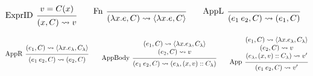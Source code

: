 \documentclass[acmsmall,review]{acmart}\settopmatter{printfolios=true,printccs=false,printacmref=false}
\theoremstyle{definition}
\theoremstyle{plain}
\newcommand*{\cons}{::}
\newcommand*{\semarrow}{\rightsquigarrow}
\begin{document}
\begin{figure}[h!]
  \scriptsize
  \begin{flushright}
    \fbox{$(e,C)\semarrow V\text{ or }(e',C')$}
  \end{flushright}
  \centering
  \vspace{0pt} %
  \[
    \begin{prooftree}
      \hypo{v=C(x)}
      \infer[left label=ExprID]1{
      (x, C)
      \semarrow
      v
      }
    \end{prooftree}\qquad
    \begin{prooftree}
      \infer[left label=Fn]0{
      (\lambda x.e, C)
      \semarrow
      \langle\lambda x.e, C\rangle
      }
    \end{prooftree}\qquad
    \begin{prooftree}
      \infer[left label={AppL}]0{
      (e_{1}\:e_{2}, C)
      \semarrow
      (e_{1},C)
      }
    \end{prooftree}
  \]

  \[
    \begin{prooftree}
      \hypo{
        \begin{matrix}
          (e_{1}, C)
          \semarrow
          \langle\lambda x.e_{\lambda}, C_{\lambda}\rangle
        \end{matrix}
      }
      \infer[left label={AppR}]1{
      (e_{1}\:e_{2}, C)
      \semarrow
      (e_{2}, C)
      }
    \end{prooftree}\qquad
    \begin{prooftree}
      \hypo{
        \begin{matrix}
          (e_{1}, C)
          \semarrow
          \langle\lambda x.e_{\lambda}, C_{\lambda}\rangle \\
          (e_{2}, C)
          \semarrow
          v
        \end{matrix}
      }
      \infer[left label={AppBody}]1{
      (e_{1}\:e_{2}, C)
      \semarrow
      (e_{\lambda}, (x, v)\cons C_{\lambda})
      }
    \end{prooftree}\qquad
    \begin{prooftree}
      \hypo{
        \begin{matrix}
          (e_{1}, C)
          \semarrow
          \langle\lambda x.e_{\lambda}, C_{\lambda}\rangle \\
          (e_{2}, C)
          \semarrow
          v                                                \\
          (e_{\lambda}, (x, v)\cons C_{\lambda})
          \semarrow
          v'
        \end{matrix}
      }
      \infer[left label={App}]1{
      (e_{1}\:e_{2}, C)
      \semarrow
      v'
      }
    \end{prooftree}
  \]


\end{figure}
\end{document}
